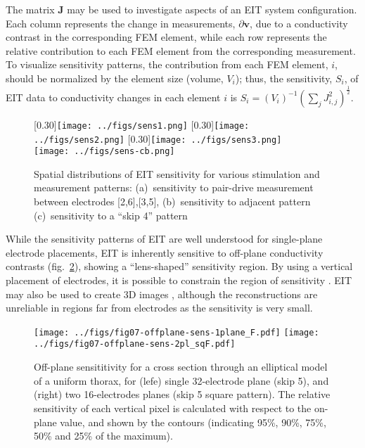 \documentclass[12pt]{article} \usepackage[margin=3cm]{geometry} \usepackage[margin=20pt,font=small,labelfont=bf]{caption}\def\TBLWIDA{35mm}\def\TBLWIDB{95mm}
\newcommand\fref[1]{fig.\ \ref{#1}}
\newcommand{\vB}{\mathbf{v}}
\newcommand{\JB}{\mathbf{J}}
\begin{document}
The matrix $\JB$ may be used to investigate
aspects of an EIT system configuration. Each column
represents the change in measurements, $\partial \vB$, due to
a conductivity contrast in the corresponding FEM element, while
each row represents the relative contribution to each FEM element
from the corresponding measurement. To visualize sensitivity patterns,
the contribution from each FEM element, $i$, should be normalized by the
element size (volume, $V_i$); thus, the sensitivity, $S_i$, of EIT data to 
conductivity changes in each element $i$ is
$ S_i = (V_i)^{-1} (\sum_j J_{i,j}^2 )^{\frac{1}{2}}$.

\begin{figure} \centering
   [0.30\columnwidth]{\texttt{[image: ../figs/sens1.png]}}\hfil%
   [0.30\columnwidth]{\texttt{[image: ../figs/sens2.png]}}\hfil%
   [0.30\columnwidth]{\texttt{[image: ../figs/sens3.png]}}\\
   \centering \texttt{[image: ../figs/sens-cb.png]}\\
\caption{%
Spatial distributions of EIT sensitivity for various
stimulation and measurement patterns:
(a)~sensitivity to pair-drive measurement between electrodes [2,6],[3,5],
(b)~sensitivity to adjacent pattern
(c)~sensitivity to a ``skip 4'' pattern
}
\label{fig:sensitivity_patterns}
\end{figure}

While the sensitivity patterns of EIT are well understood for 
single-plane electrode placements, EIT is inherently sensitive
to off-plane conductivity contrasts (\fref{fig:off_plane_sensitivity}),
showing a ``lens-shaped'' sensitivity region.
By using a vertical placement of electrodes, it is possible to
constrain the region of sensitivity \cite{Grychtol20163DEIT}.
EIT may also be used to create 3D images \cite{Metherall1996Three},
although the reconstructions are unreliable in regions far from electrodes
as the sensitivity is very small.

\begin{figure} \centering
   \texttt{[image: ../figs/fig07-offplane-sens-1plane\_F.pdf]}
   \texttt{[image: ../figs/fig07-offplane-sens-2pl\_sqF.pdf]}
\caption{%
Off-plane sensititivity for a cross section through an elliptical
model of a uniform thorax, for 
(lefe)  single 32-electrode plane (skip 5), and
(right) two 16-electrodes planes  (skip 5 square pattern).
The relative sensitivity of each vertical
pixel is calculated with respect to the on-plane value, and shown by
the contours (indicating 95\%, 90\%, 75\%, 50\% and 25\% of the maximum).
}
\label{fig:off_plane_sensitivity}
\end{figure}
\end{document}
